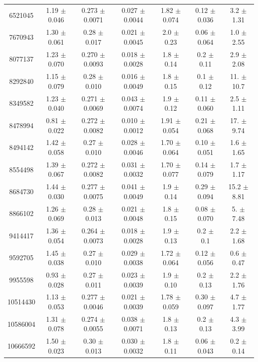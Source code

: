 {\begin{table}
\begin{tabular}{ccccccc}
 6521045 & 1.19 $\pm$ 0.046  & 0.273 $\pm$ 0.0071 & 0.027 $\pm$ 0.0044 & 1.82 $\pm$ 0.074 & 0.12 $\pm$ 0.036 &  3.2 $\pm$  1.31 \\
 7670943 & 1.30 $\pm$ 0.061  & 0.28  $\pm$ 0.017  & 0.021 $\pm$ 0.0045 & 2.0  $\pm$ 0.23  & 0.06 $\pm$ 0.064 &  1.0 $\pm$  2.55 \\
 8077137 & 1.23 $\pm$ 0.070  & 0.270 $\pm$ 0.0093 & 0.018 $\pm$ 0.0028 & 1.8  $\pm$ 0.14  & 0.2  $\pm$ 0.11  &  2.9 $\pm$  2.08 \\
 8292840 & 1.15 $\pm$ 0.079  & 0.28  $\pm$ 0.010  & 0.016 $\pm$ 0.0049 & 1.8  $\pm$ 0.15  & 0.1  $\pm$ 0.12  & 11.  $\pm$ 10.7  \\
 8349582 & 1.23 $\pm$ 0.040  & 0.271 $\pm$ 0.0069 & 0.043 $\pm$ 0.0074 & 1.9  $\pm$ 0.12  & 0.11 $\pm$ 0.060 &  2.5 $\pm$  1.11 \\
 8478994 & 0.81 $\pm$ 0.022  & 0.272 $\pm$ 0.0082 & 0.010 $\pm$ 0.0012 & 1.91 $\pm$ 0.054 & 0.21 $\pm$ 0.068 & 17.  $\pm$  9.74 \\
 8494142 & 1.42 $\pm$ 0.058  & 0.27  $\pm$ 0.010  & 0.028 $\pm$ 0.0046 & 1.70 $\pm$ 0.064 & 0.10 $\pm$ 0.051 &  1.6 $\pm$  1.65 \\
 8554498 & 1.39 $\pm$ 0.067  & 0.272 $\pm$ 0.0082 & 0.031 $\pm$ 0.0032 & 1.70 $\pm$ 0.077 & 0.14 $\pm$ 0.079 &  1.7 $\pm$  1.17 \\
 8684730 & 1.44 $\pm$ 0.030  & 0.277 $\pm$ 0.0075 & 0.041 $\pm$ 0.0049 & 1.9  $\pm$ 0.14  & 0.29 $\pm$ 0.094 & 15.2 $\pm$  8.81 \\
 8866102 & 1.26 $\pm$ 0.069  & 0.28  $\pm$ 0.013  & 0.021 $\pm$ 0.0048 & 1.8  $\pm$ 0.15  & 0.08 $\pm$ 0.070 &  5.  $\pm$  7.48 \\
 9414417 & 1.36 $\pm$ 0.054  & 0.264 $\pm$ 0.0073 & 0.018 $\pm$ 0.0028 & 1.9  $\pm$ 0.13  & 0.2  $\pm$ 0.1   &  2.2 $\pm$  1.68 \\
 9592705 & 1.45 $\pm$ 0.038  & 0.27  $\pm$ 0.010  & 0.029 $\pm$ 0.0038 & 1.72 $\pm$ 0.064 & 0.12 $\pm$ 0.056 &  0.6 $\pm$  0.47 \\
 9955598 & 0.93 $\pm$ 0.028  & 0.27  $\pm$ 0.011  & 0.023 $\pm$ 0.0039 & 1.9  $\pm$ 0.10  & 0.2  $\pm$ 0.13  &  2.2 $\pm$  1.76 \\
10514430 & 1.13 $\pm$ 0.053  & 0.277 $\pm$ 0.0046 & 0.021 $\pm$ 0.0039 & 1.78 $\pm$ 0.059 & 0.30 $\pm$ 0.097 &  4.7 $\pm$  1.77 \\
10586004 & 1.31 $\pm$ 0.078  & 0.274 $\pm$ 0.0055 & 0.038 $\pm$ 0.0071 & 1.8  $\pm$ 0.13  & 0.2  $\pm$ 0.13  &  4.3 $\pm$  3.99 \\
10666592 & 1.50 $\pm$ 0.023  & 0.30  $\pm$ 0.013  & 0.030 $\pm$ 0.0032 & 1.8  $\pm$ 0.11  & 0.06 $\pm$ 0.043 &  0.2 $\pm$  0.14 \\

\end{tabular}
\end{table}}
